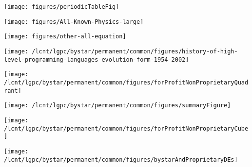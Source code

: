\documentclass[twoside]{book}
\begin{document}
\setcounter{page}{2}
\renewcommand*\contentsname{Detailed Contents}
\setcounter{page}{1}

\begin{center}
\texttt{[image: figures/periodicTableFig]}
\end{center}

\clearpage%

\begin{center}
\texttt{[image: figures/All-Known-Physics-large]}
\end{center}

\clearpage%

\begin{center}
\texttt{[image: figures/other-all-equation]}
\end{center}

\clearpage%

\begin{center}
\texttt{[image: /lcnt/lgpc/bystar/permanent/common/figures/history-of-high-level-programming-languages-evolution-form-1954-2002]}
\end{center}

\clearpage%

\begin{center}
\texttt{[image: /lcnt/lgpc/bystar/permanent/common/figures/forProfitNonProprietaryQuadrant]}
\end{center}

\clearpage%

\begin{center}
\texttt{[image: /lcnt/lgpc/bystar/permanent/common/figures/summaryFigure]}
\end{center}

\clearpage%

\begin{center}
\texttt{[image: /lcnt/lgpc/bystar/permanent/common/figures/forProfitNonProprietaryCube]}
\end{center}

\clearpage%

\begin{center}
\texttt{[image: /lcnt/lgpc/bystar/permanent/common/figures/bystarAndProprietaryDEs]}
\end{center}

\clearpage%
\end{document}
